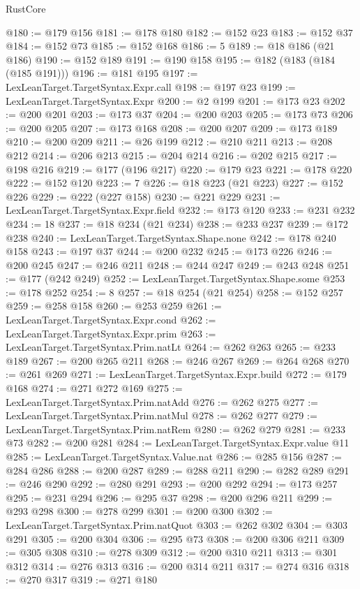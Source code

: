 \begin{lexlean}{RustCore}
\begin{coremodule}
@180 := @179 @156
@181 := @178 @180
@182 := @152 @23
@183 := @152 @37
@184 := @152 @73
@185 := @152 @168
@186 := 5
@189 := @18 @186 (@21 @186)
@190 := @152 @189
@191 := @190 @158
@195 := @182 (@183 (@184 (@185 @191)))
@196 := @181 @195
@197 := LexLeanTarget.TargetSyntax.Expr.call
@198 := @197 @23
@199 := LexLeanTarget.TargetSyntax.Expr
@200 := @2 @199
@201 := @173 @23
@202 := @200 @201
@203 := @173 @37
@204 := @200 @203
@205 := @173 @73
@206 := @200 @205
@207 := @173 @168
@208 := @200 @207
@209 := @173 @189
@210 := @200 @209
@211 := @26 @199
@212 := @210 @211
@213 := @208 @212
@214 := @206 @213
@215 := @204 @214
@216 := @202 @215
@217 := @198 @216
@219 := @177 (@196 @217)
@220 := @179 @23
@221 := @178 @220
@222 := @152 @120
@223 := 7
@226 := @18 @223 (@21 @223)
@227 := @152 @226
@229 := @222 (@227 @158)
@230 := @221 @229
@231 := LexLeanTarget.TargetSyntax.Expr.field
@232 := @173 @120
@233 := @231 @232
@234 := 18
@237 := @18 @234 (@21 @234)
@238 := @233 @237
@239 := @172 @238
@240 := LexLeanTarget.TargetSyntax.Shape.none
@242 := @178 @240 @158
@243 := @197 @37
@244 := @200 @232
@245 := @173 @226
@246 := @200 @245
@247 := @246 @211
@248 := @244 @247
@249 := @243 @248
@251 := @177 (@242 @249)
@252 := LexLeanTarget.TargetSyntax.Shape.some
@253 := @178 @252
@254 := 8
@257 := @18 @254 (@21 @254)
@258 := @152 @257
@259 := @258 @158
@260 := @253 @259
@261 := LexLeanTarget.TargetSyntax.Expr.cond
@262 := LexLeanTarget.TargetSyntax.Expr.prim
@263 := LexLeanTarget.TargetSyntax.Prim.natLt
@264 := @262 @263
@265 := @233 @189
@267 := @200 @265 @211
@268 := @246 @267
@269 := @264 @268
@270 := @261 @269
@271 := LexLeanTarget.TargetSyntax.Expr.build
@272 := @179 @168
@274 := @271 @272 @169
@275 := LexLeanTarget.TargetSyntax.Prim.natAdd
@276 := @262 @275
@277 := LexLeanTarget.TargetSyntax.Prim.natMul
@278 := @262 @277
@279 := LexLeanTarget.TargetSyntax.Prim.natRem
@280 := @262 @279
@281 := @233 @73
@282 := @200 @281
@284 := LexLeanTarget.TargetSyntax.Expr.value @11
@285 := LexLeanTarget.TargetSyntax.Value.nat
@286 := @285 @156
@287 := @284 @286
@288 := @200 @287
@289 := @288 @211
@290 := @282 @289
@291 := @246 @290
@292 := @280 @291
@293 := @200 @292
@294 := @173 @257
@295 := @231 @294
@296 := @295 @37
@298 := @200 @296 @211
@299 := @293 @298
@300 := @278 @299
@301 := @200 @300
@302 := LexLeanTarget.TargetSyntax.Prim.natQuot
@303 := @262 @302
@304 := @303 @291
@305 := @200 @304
@306 := @295 @73
@308 := @200 @306 @211
@309 := @305 @308
@310 := @278 @309
@312 := @200 @310 @211
@313 := @301 @312
@314 := @276 @313
@316 := @200 @314 @211
@317 := @274 @316
@318 := @270 @317
@319 := @271 @180

\end{coremodule}
\end{lexlean}
